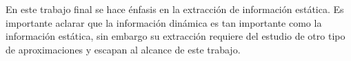 %
%
% 
%







En este trabajo final se hace énfasis en la extracción de información estática. Es importante aclarar que la información dinámica es tan importante como la información estática, sin embargo su extracción requiere del estudio de otro tipo de aproximaciones y escapan al alcance de este trabajo.

